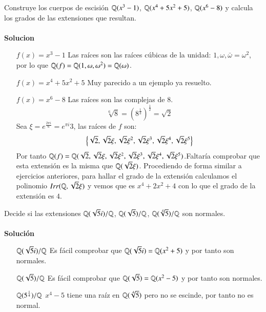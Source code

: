 \begin{ex}[H3.1]
    Construye los cuerpos de escisión $\mathbb{Q}(x^3-1)$, $\mathbb{Q}(x^4 + 5x^2 + 5)$, $\mathbb{Q}(x^6-8)$ y calcula los grados de las extensiones que resultan.\\\\

    \textbf{Solucion}\\
    \begin{itemize}
        \item[$f(x) = x^3-1$] Las raíces son las raíces cúbicas de la unidad: $1, \omega, \bar\omega = \omega^2$, por lo que $\mathbb{Q}(f) = \mathbb{Q}(1, \omega, \omega^2) = \mathbb{Q}(\omega)$.
        \item[$f(x) = x^4+5x^2+5$] Muy parecido a un ejemplo ya resuelto.
        \item[$f(x) = x^6 - 8$] Las raíces son las complejas de $8$.
        $$
            \sqrt[6] 8 = (8^\frac{1}{3})^\frac{1}{2} = \sqrt 2
        $$
        Sea $\xi = e^\frac{2 \pi i}{6} = e^{\pi i }{3}$, las raíces de $f$ son:
        $$
            \left\{\sqrt 2, \sqrt 2 \xi, \sqrt 2 \xi^2, \sqrt 2 \xi^3, \sqrt 2 \xi^4, \sqrt 2 \xi^5\right\}
        $$
        Por tanto $\mathbb{Q}(f) = \mathbb{Q}(\sqrt 2, \sqrt 2 \xi, \sqrt 2 \xi^2, \sqrt 2 \xi^3, \sqrt 2 \xi^4, \sqrt 2 \xi^5) $.Faltaría comprobar que esta extensión es la misma que $\mathbb{Q}(\sqrt 2 \xi)$. Procediendo de forma similar a ejercicios anteriores, para hallar el grado de la extensión calculamos el polinomio $Irr(\mathbb{Q}, \sqrt 2 \xi)$ y vemos que es $x^4 + 2x^2 + 4$ con lo que el grado de la extensión es $4$.
    \end{itemize}
\end{ex}

\begin{ex}[H3.5]
    Decide si las extensiones $\mathbb{Q}(\sqrt 5 i)/\mathbb{Q}$, $\mathbb{Q}(\sqrt 5)/\mathbb{Q}$, $\mathbb{Q}(\sqrt[4] 5)/\mathbb{Q}$ son normales.\\\\

    \textbf{Solución}\\
    \begin{itemize}
        \item[$\mathbb{Q}(\sqrt 5 i)/\mathbb{Q}$] Es fácil comprobar que $\mathbb{Q}(\sqrt 5 i) = \mathbb{Q}(x^2 + 5)$ y por tanto son normales.
        \item[$\mathbb{Q}(\sqrt 5)/\mathbb{Q}$] Es fácil comprobar que $\mathbb{Q}(\sqrt 5) = \mathbb{Q}(x^2 - 5)$ y por tanto son normales.
        \item[$\mathbb{Q}(5^{\frac{1}{4}})/\mathbb{Q}$] $x^4 - 5$ tiene una raíz en $\mathbb{Q}(\sqrt[4]{5})$ pero no se escinde, por tanto no es normal.
    \end{itemize}
\end{ex}

